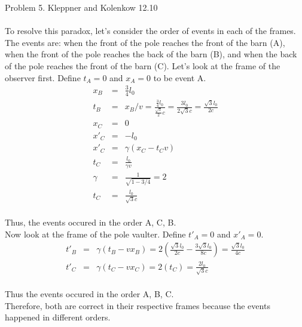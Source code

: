 \documentclass[11pt]{amsart}
\begin{document}
Problem 5. Kleppner and Kolenkow 12.10 \\ \\
To resolve this paradox, let's consider the order of events in each of the frames. The events are: when the front of the pole reaches the front of the barn (A), when the front of the pole reaches the back of the barn (B), and when the back of the pole reaches the front of the barn (C). Let's look at the frame of the observer first. Define $t_{A}=0$ and $x_{A}=0$ to be event A. \\
\begin{eqnarray*} 
x_{B} &=& \frac{3}{4}l_{0} \\
t_{B} &=& x_{B}/v = \frac{\frac{3}{4}l_{0}}{\frac{\sqrt{3}}{2}c} = \frac{3l_{0}}{2\sqrt{3}c}= \frac{\sqrt{3}l_{0}}{2c}  \\
x_{C} &=& 0 \\
x'_{C} &=& -l_{0} \\
x'_{C} &=& \gamma(x_{C}-t_{C}v) \\
t_{C} &=& \frac{l_{0}}{\gamma{v}} \\
\gamma &=& \frac{1}{\sqrt{1-3/4}} = 2 \\
t_{C} &=& \frac{l_{0}}{\sqrt{3}c} 
\end{eqnarray*} \\
Thus, the events occured in the order A, C, B. \\
Now look at the frame of the pole vaulter. Define $t'_{A}=0$ and $x'_{A}=0$. \\
\begin{eqnarray*} 
t'_{B} &=& \gamma(t_{B}-vx_{B}) = 2(\frac{\sqrt{3}l_{0}}{2c}-\frac{3\sqrt{3}l_{0}}{8c}) = \frac{\sqrt{3}l_{0}}{4c} \\
t'_{C} &=& \gamma(t_{C}-vx_{C}) = 2(t_{C}) =\frac{2l_{0}}{\sqrt{3}c} 
\end{eqnarray*} \\
Thus the events occured in the order A, B, C. \\
Therefore, both are correct in their respective frames because the events happened in different orders. \\
\end{document}
